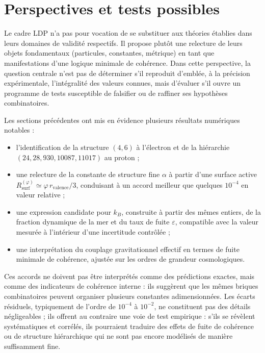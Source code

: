 \documentclass[11pt,a4paper]{article}
\begin{document}
\section{Perspectives et tests possibles}

Le cadre LDP n’a pas pour vocation de se substituer aux théories établies dans leurs domaines de validité respectifs. Il propose plutôt une relecture de leurs objets fondamentaux (particules, constantes, métrique) en tant que manifestations d’une logique minimale de cohérence. Dans cette perspective, la question centrale n’est pas de déterminer s’il reproduit d’emblée, à la précision expérimentale, l’intégralité des valeurs connues, mais d’évaluer s’il ouvre un programme de tests susceptible de falsifier ou de raffiner ses hypothèses combinatoires.

Les sections précédentes ont mis en évidence plusieurs résultats numériques notables : 
\begin{itemize}
  \item l’identification de la structure \(\left(4,6\right)\) à l’électron et de la hiérarchie \(\left(24,28,930,10087,11017\right)\) au proton ; 
  \item une relecture de la constante de structure fine \(\alpha\) à partir d’une surface active \(R_{\mathrm{surf}}^{\left(\varphi\right)} \simeq \varphi\, r_{\mathrm{valence}}/3\), conduisant à un accord meilleur que quelques \(10^{-4}\) en valeur relative ; 
  \item une expression candidate pour \(k_B\), construite à partir des mêmes entiers, de la fraction dynamique de la mer et du taux de fuite \(\varepsilon\), compatible avec la valeur mesurée à l’intérieur d’une incertitude contrôlée ; 
  \item une interprétation du couplage gravitationnel effectif en termes de fuite minimale de cohérence, ajustée sur les ordres de grandeur cosmologiques. 
\end{itemize}

Ces accords ne doivent pas être interprétés comme des prédictions exactes, mais comme des indicateurs de cohérence interne : ils suggèrent que les mêmes briques combinatoires peuvent organiser plusieurs constantes adimensionnées. Les écarts résiduels, typiquement de l’ordre de \(10^{-4}\) à \(10^{-2}\), ne constituent pas des détails négligeables ; ils offrent au contraire une voie de test empirique : s’ils se révèlent systématiques et corrélés, ils pourraient traduire des effets de fuite de cohérence ou de structure hiérarchique qui ne sont pas encore modélisés de manière suffisamment fine.
\end{document}
